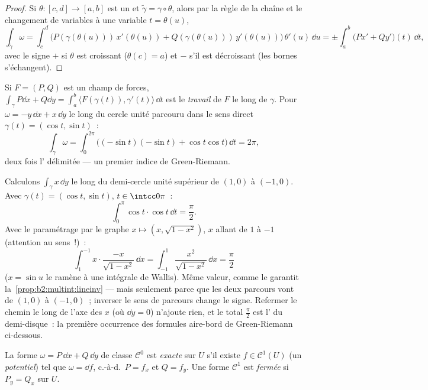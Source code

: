 \begin{proof}
Si $\theta \colon [c, d] \to [a, b]$ est un  et
$\tilde\gamma = \gamma \circ \theta$, alors par la règle de la chaîne
et le changement de variables à une variable $t = \theta(u)$,
\[
\int_{\tilde\gamma}\omega
= \int_c^d \bigl(P(\gamma(\theta(u)))\,x'(\theta(u))
+ Q(\gamma(\theta(u)))\,y'(\theta(u))\bigr)\,\theta'(u)\,\dd u
= \pm\int_a^b \bigl(Px' + Qy'\bigr)(t)\,\dd t ,
\]
avec le signe $+$ si $\theta$ est croissant ($\theta(c) = a$) et $-$
s'il est décroissant (les bornes s'échangent).
\end{proof}

\begin{example}\label{ex:b2:multint:work}
Si $F = (P, Q)$ est un champ de forces, $\int_\gamma P\dd x + Q\dd y =
\int_a^b \langle F(\gamma(t)), \gamma'(t)\rangle\,\dd t$ est le
\emph{travail} de $F$ le long de $\gamma$. Pour $\omega = -y\,\dd x +
x\,\dd y$ le long du cercle unité parcouru dans le sens direct
$\gamma(t) = (\cos t, \sin t)$~:
\[
\int_\gamma \omega
= \int_0^{2\pi}\bigl((-\sin t)(-\sin t)
+ \cos t\cos t\bigr)\,\dd t = 2\pi ,
\]
deux fois l' délimitée --- un premier indice de Green-Riemann.
\end{example}

\begin{example}\label{ex:b2:multint:semicircle}
Calculons $\int_\gamma x\,\dd y$ le long du demi-cercle unité
supérieur de $(1, 0)$ à $(-1, 0)$. Avec $\gamma(t) =
(\cos t, \sin t)$, $t \in \intcc0\pi$~:
\[
\int_0^\pi\cos t\cdot\cos t\,\dd t = \frac\pi2 .
\]
Avec le paramétrage par le graphe $x \mapsto (x, \sqrt{1 -
x^2})$, $x$ allant de $1$ à $-1$ (attention au sens~!)~:
\[
\int_1^{-1}x\cdot\frac{-x}{\sqrt{1 - x^2}}\,\dd x
= \int_{-1}^{1}\frac{x^2}{\sqrt{1 - x^2}}\,\dd x
= \frac\pi2
\]
($x = \sin u$ le ramène à une intégrale de Wallis). Même valeur,
comme le garantit la~\cref{prop:b2:multint:lineinv} --- mais seulement
parce que les deux parcours vont de $(1,0)$ à $(-1,0)$~; inverser le
sens de parcours change le signe. Refermer le chemin le long de l'axe
des $x$ (où $\dd y = 0$) n'ajoute rien, et le total $\frac\pi2$
est l' du demi-disque~: la première occurrence des formules
aire-bord de Green-Riemann ci-dessous.
\end{example}

\begin{definition}\label{def:b2:multint:exact}
La forme $\omega = P\,\dd x + Q\,\dd y$ de classe $\mathcal{C}^0$
est \emph{exacte} sur $U$ s'il existe $f \in \mathcal{C}^1(U)$
(un \emph{potentiel}) tel que $\omega = \dd f$, c.-à-d.\ $P = f_x$ et $Q
= f_y$. Une forme $\mathcal{C}^1$ est \emph{fermée} si $P_y = Q_x$ sur
$U$.
\end{definition}

